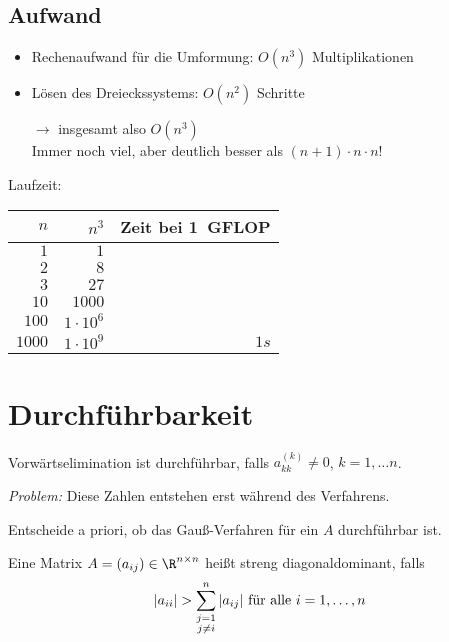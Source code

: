 \subsection{Aufwand}

\begin{itemize}
\item Rechenaufwand für die Umformung: $O(n^3)$ Multiplikationen
\item Lösen des Dreieckssystems: $O(n^2)$ Schritte
\item[$\rightarrow$] insgesamt also $O(n^3)$
\\ Immer noch viel, aber deutlich besser als $(n+1)\cdot n\cdot n!$
\end{itemize}

Laufzeit:

\begin{tabular}{ r | r | r }
  $n$ & $n^3$ & Zeit bei 1~GFLOP\\ \hline
  $1$ & $1$ \\
  $2$ & $8$ \\
  $3$ & $27$ \\
  $10$ & $1000$ \\
  $100$ & $1\cdot 10^6$ \\
  $1000$ & $1\cdot 10^9$ & $1s$
\end{tabular}

\section{Durchführbarkeit}
Vorwärtselimination ist durchführbar, falls $a_{kk}^{(k)} \neq 0$, $k = 1, \dots n$.

\medskip

\emph{Problem:} Diese Zahlen entstehen erst während des Verfahrens.

\medskip

Entscheide a priori, ob das Gauß-Verfahren für ein $A$ durchführbar ist.
\begin{definition}
Eine Matrix $A = (a_{ij}) \in \R^{n\times n}$ heißt streng diagonaldominant, falls
\begin{equation*}
\vert a_{ii} \vert > \sum_{\substack{j=1 \\ j \neq i}}^n \vert a_{ij} \vert \textnormal{ für alle } i = 1, \dots, n
\end{equation*}
\end{definition}

